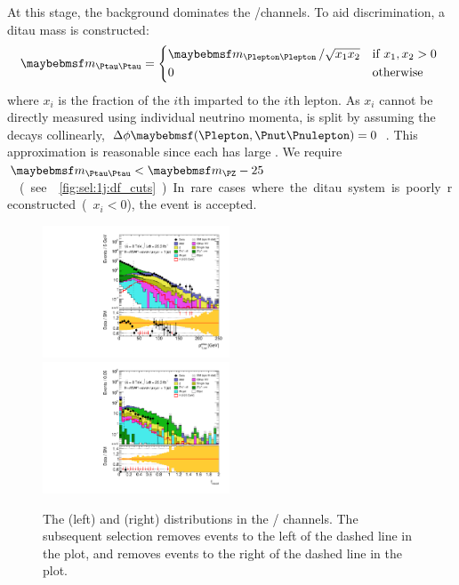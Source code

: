 At this stage, the \DYtt background dominates the \emch/\mech channels. To aid 
discrimination, a ditau mass is constructed:
\begin{equation}
	\mtautau = 
		\begin{dcases*}
			\mll \,/ \sqrt{x_1 x_2} & if $x_1, x_2 > 0$ \\
			0 & otherwise
		\end{dcases*}
\end{equation}
where $x_i$ is the \pt fraction of the $i$th \Ptau imparted to the $i$th lepton. As $x_i$ 
cannot be directly measured using individual neutrino momenta, \corrtrackmet is split by 
assuming the \Ptau decays collinearly, \ie 
$\Delta\phi\parenths{\Plepton,\HepProcess{\Pnut\Pnulepton}} = 0$ \cite{Tau:collinear}. 
This approximation is reasonable since each \Ptau has large \pt. We require 
\unit{$\mtautau < \mZ - 25$}{\GeV} (see \Figure~\ref{fig:sel:1j:df_cuts}). In rare cases 
where the ditau system is poorly reconstructed (\ie $x_i < 0$), the event is accepted.

\begin{figure}[b]
	\includegraphics[width=0.495\textwidth]{tex/selection/eemm_CutTopoMll_1jet_METRel_TrackHWW_mh125_log}
	\hfill
	\includegraphics[width=0.495\textwidth]{tex/selection/eemm_CutTopoDPhill_1jet_f_recoil_ext_mh125_log}
	\caption{The \trackmetrel (left) and \frecoil (right) distributions in the \eech/\mmch 
	channels. The subsequent selection removes events to the left of the dashed line in the 
	\trackmetrel plot, and removes events to the right of the dashed line in the \frecoil 
	plot.}
	\label{fig:sel:1j:sf_cuts}
\end{figure}

